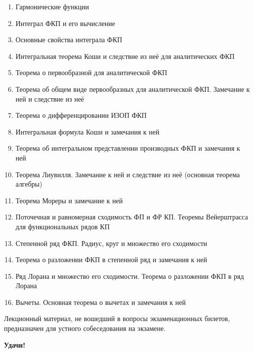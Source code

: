 \documentclass[../main.tex]{subfiles}
\begin{document}
\begin{enumerate}
    \item Гармонические функции
    \item Интеграл ФКП и его вычисление
    \item Основные свойства интеграла ФКП
    \item Интегральная теорема Коши и следствие из неё для аналитических ФКП
    \item Теорема о первообразной для аналитической ФКП
    \item Теорема об общем виде первообразных для аналитической ФКП. Замечание к ней и следствие из неё
    \item Теорема о дифференцировании ИЗОП ФКП
    \item Интегральная формула Коши и замечания к ней
    \item Теорема об интегральном представлении производных ФКП и замечания к ней
    \item Теорема Лиувилля. Замечание к ней и следствие из неё (основная теорема алгебры)
    \item Теорема Мореры и замечание к ней
    \item Поточечная и равномерная сходимость ФП и ФР КП. Теоремы Вейерштрасса для функциональных рядов КП
    \item Степенной ряд ФКП. Радиус, круг и множество его сходимости
    \item Теорема о разложении ФКП в степенной ряд и замечания к ней
    \item Ряд Лорана и множество его сходимости. Теорема о разложении ФКП в ряд Лорана
    \item Вычеты. Основная теорема о вычетах и замечания к ней
 \end{enumerate}
 
\begin{rem}
Лекционный материал, не вошедший в вопросы экзаменационных билетов, предназначен для устного собеседования на экзамене.
\end{rem}

\medskip

\textbf{Удачи!}
\end{document}

